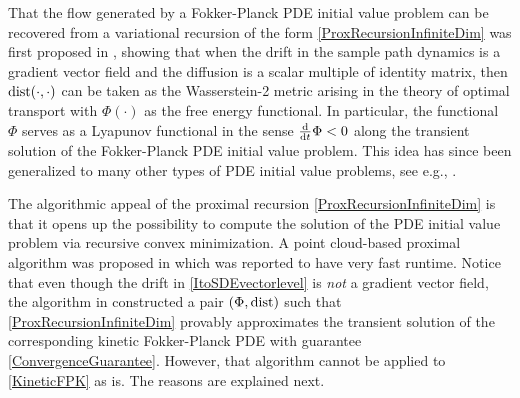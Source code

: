 \documentclass[10pt,twocolumn]{IEEEtran}
\newcommand{\differential}{{\rm{d}}}
\begin{document}
That the flow generated by a Fokker-Planck PDE initial value problem can be recovered from a variational recursion of the form \eqref{ProxRecursionInfiniteDim} was first proposed in \cite{jordan1998variational}, showing that when the drift in the sample path dynamics is a gradient vector field and the diffusion is a scalar multiple of identity matrix, then ${\rm{dist}}(\cdot,\cdot)$ can be taken as the Wasserstein-2 metric arising in the theory of optimal transport \cite{villani2003topics} with $\Phi(\cdot)$ as the free energy functional. In particular, the functional $\Phi$ serves as a Lyapunov functional in the sense $\frac{\differential}{\differential t}\Phi < 0$ along the transient solution of the Fokker-Planck PDE initial value problem. This idea has since been generalized to many other types of PDE initial value problems, see e.g., \cite{ambrosio2008gradient,santambrogio2017euclidean}. 

The algorithmic appeal of the proximal recursion \eqref{ProxRecursionInfiniteDim} is that it opens up the possibility to compute the solution of the PDE initial value problem via recursive convex minimization. A point cloud-based proximal algorithm was proposed in \cite{caluya2019ACC,caluya2019TAC} which was reported to have very fast runtime. Notice that even though the drift in \eqref{ItoSDEvectorlevel} is \emph{not} a gradient vector field, the algorithm in \cite[Sec. V.B]{caluya2019TAC} constructed a pair $\left(\Phi,{\rm{dist}}\right)$ such that \eqref{ProxRecursionInfiniteDim} provably approximates the transient solution of the corresponding kinetic Fokker-Planck PDE with guarantee \eqref{ConvergenceGuarantee}. However, that algorithm cannot be applied to \eqref{KineticFPK} as is. The reasons are explained next.
\end{document}
